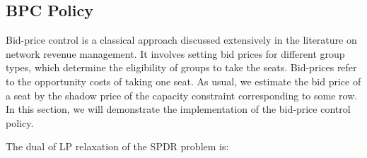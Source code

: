 




\subsection{BPC Policy}
Bid-price control is a classical approach discussed extensively in the literature on network revenue management. It involves setting bid prices for different group types, which determine the eligibility of groups to take the seats. Bid-prices refer to the opportunity costs of taking one seat. As usual, we estimate the bid price of a seat by the shadow price of the capacity constraint corresponding to some row. In this section, we will demonstrate the implementation of the bid-price control policy. 

The dual of LP relaxation of the SPDR problem is:

